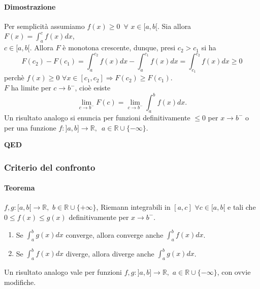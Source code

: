 \documentclass{article}
\newcommand{\R}{\mathbb{R}}
\begin{document}
\paragraph{{Dimostrazione}}
Per semplicità assumiamo $f(x)\geq 0 \,\,\, \forall\,\, x\in[a,b[$. Sia allora $F(x)=\int_{a}^{c} f(x)dx$,\\$c\in [a,b[$. Allora $F$ è monotona crescente, dunque, presi $c_2 > c_1$ si ha
\begin{equation*}
    F(c_2)-F(c_1)=\int_{a}^{c_2}f(x)dx - \int_{a}^{c_1} f(x)dx = \int_{c_1}^{c_2} f(x)dx \geq 0
\end{equation*}
perchè $f(x)\geq 0 \,\,\forall x \in [c_1,c_2] \Rightarrow F(c_2)\geq F(c_1)$.\\
$F$ ha limite per $c \rightarrow b^-$, cioè esiste
\begin{equation*}
    \lim_{c \rightarrow b^-} F(c)=\lim_{c \rightarrow b^-} \int_{a}^{b} f(x)dx.
\end{equation*}
Un risultato analogo si enuncia per funzioni definitivamente $\leq 0$ per $ x\rightarrow b^-$ o per una funzione $f:]a,b]\rightarrow \R,\,\,\, a\in\R\cup\{-\infty\}$.
\begin{flushright}
\textbf{QED}
\end{flushright}

\subsubsection{{Criterio del confronto}}
\paragraph{{Teorema}}
$f,g:[a,b[\rightarrow\R, \,\, b\in\R\cup\{+\infty\}$, Riemann integrabili in $[a,c] \,\, \forall c \in [a,b[$ e tali che $0\leq f(x) \leq g(x)$ definitivamente per $x \rightarrow b^-$.
\begin{enumerate}
    \item Se $\int_{a}^{b}g(x)dx$ converge, allora converge anche $\int_{a}^{b} f(x)dx$.
    \item Se $\int_{a}^{b} f(x)dx$ diverge, allora diverge anche $\int_{a}^{b}g(x)dx$.
\end{enumerate}
Un risultato analogo vale per funzioni $f,g:]a,b]\rightarrow\R, \,\, a\in\R\cup\{-\infty\}$, con ovvie modifiche.
\end{document}
